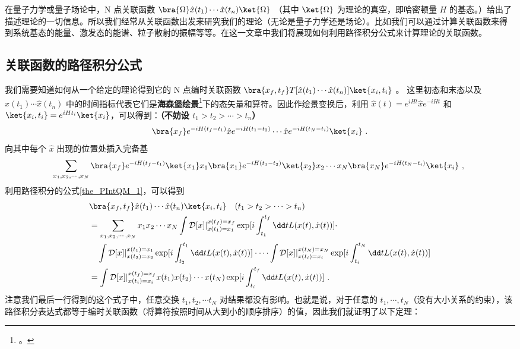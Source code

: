 
在量子力学或量子场论中，N 点关联函数 $\bra{\Omega}\hat x(t_1)\cdots \hat x(t_n)\ket{\Omega}$ （其中 $\ket{\Omega}$ 为理论的真空，即哈密顿量 $H$ 的基态。）给出了描述理论的一切信息。所以我们经常从关联函数出发来研究我们的理论（无论是量子力学还是场论）。比如我们可以通过计算关联函数来得到系统基态的能量、激发态的能谱、粒子散射的振幅等等。在这一文章中我们将展现如何利用路径积分公式来计算理论的关联函数。
\subsection{关联函数的路径积分公式}
我们需要知道如何从一个给定的理论得到它的 N 点编时关联函数
 $\bra{x_f,t_f} T[\hat x(t_1)\cdots \hat x(t_n)]\ket{x_i,t_i}$ 。
这里初态和末态以及 $\hat x(t_1)\cdots \hat x(t_n)$ 中的时间指标代表它们是\textbf{海森堡绘景}\footnote{。}下的态矢量和算符。因此作绘景变换后，利用 $\hat x(t)=e^{iHt}\hat x e^{-iHt}$ 和 $\ket{x_i,t_i}=e^{iHt_i} \ket{x_i}$，可以得到：\textbf{（不妨设 $t_1>t_2>\cdots >t_n$）}
\begin{equation}
\bra{x_f} e^{-iH (t_f-t_1)} \hat x e^{-iH(t_1-t_2)}\cdots \hat x e^{-iH(t_N-t_i)}\ket{x_i}~.
\end{equation}
向其中每个 $\hat x$ 出现的位置处插入完备基
\begin{equation}
\begin{aligned}
\sum_{x_1,x_2,\cdots,x_N}\bra{x_f} e^{-iH (t_f-t_1)} \ket{x_{1}}x_1\bra{x_1} e^{-iH(t_1-t_2)}\ket{x_2}x_2\cdots x_N \bra{x_N} e^{-iH(t_N-t_i)}\ket{x_i}~,
\end{aligned}~
\end{equation}
利用路径积分的公式\autoref{the_PIntQM_1}，可以得到
\begin{equation}
\begin{aligned}
&\bra{x_f,t_f} \hat x(t_1)\cdots \hat x(t_n)\ket{x_i,t_i}\quad (t_1>t_2>\cdots >t_n)\\
&=\sum_{x_1,x_2,\cdots,x_N}x_1x_2\cdots x_N
\int \mathcal{D}[x]|_{x(t_1)=x_1}^{x(t_f)=x_f} \exp[i\int_{t_1}^{t_f} \dd t L(x(t),\dot x(t))] \cdot \\
&\quad \int \mathcal{D}[x]|_{x(t_2)=x_2}^{x(t_1)=x_1}
\exp[i\int_{t_2}^{t_1} \dd t L(x(t),\dot x(t))]
\cdot \cdots 
\int \mathcal{D}[x]|_{x(t_i)=x_i}^{x(t_N)=x_N} 
\exp[i\int_{t_i}^{t_N} \dd t L(x(t),\dot x(t))]\\
&=\int \mathcal{D}[x]|_{x(t_i)=x_i}^{x(t_f)=x_f} x(t_1)x(t_2)\cdots x(t_N) \exp[i\int_{t_i}^{t_f} \dd t L(x(t),\dot x(t))]~.
\end{aligned}
\end{equation}
注意我们最后一行得到的这个式子中，任意交换 $t_1,t_2,\cdots t_N$ 对结果都没有影响。也就是说，对于任意的 $t_1,\cdots,t_N$（没有大小关系的约束），该路径积分表达式都等于编时关联函数（将算符按照时间从大到小的顺序排序）的值，因此我们就证明了以下定理：

